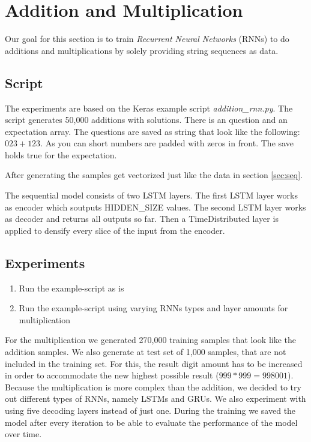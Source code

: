 \documentclass{article}[]
\begin{document}
\section{Addition and Multiplication}
\label{sec:rnn}
Our goal for this section is to train \emph{Recurrent Neural Networks} (RNNs) to do additions and multiplications by solely providing string sequences as data.

\subsection{Script}
The experiments are based on the Keras example script \textit{addition\_rnn.py}\cite{kerasexamples}.
The script generates 50,000 additions with solutions.
There is an question and an expectation array.
The questions are saved as string that look like the following:
$023+123$.
As you can short numbers are padded with zeros in front.
The save holds true for the expectation.

After generating the samples get vectorized just like the data in section \ref{sec:seq}.


The sequential model consists of two LSTM layers.
The first LSTM layer works as encoder which soutputs HIDDEN\_SIZE values.
The second LSTM layer works as decoder and returns all outputs so far.
Then a TimeDistributed layer is applied to densify every slice of the input from the encoder.

\subsection{Experiments}

\begin{enumerate}
	\item{Run the example-script as is}
	\item{Run the example-script using varying RNNs types and layer amounts for multiplication}
\end{enumerate}

For the multiplication we generated 270,000 training samples that look like the addition samples.
We also generate at test set of 1,000 samples, that are not included in the training set.
For this, the result digit amount has to be increased in order to accommodate the new highest possible result ($999*999=998001$).
Because the multiplication is more complex than the addition, we decided to try out different types of RNNs, namely LSTMs and GRUs.
We also experiment with using five decoding layers instead of just one.
During the training we saved the model after every iteration to be able to evaluate the performance of the model over time.
\end{document}
